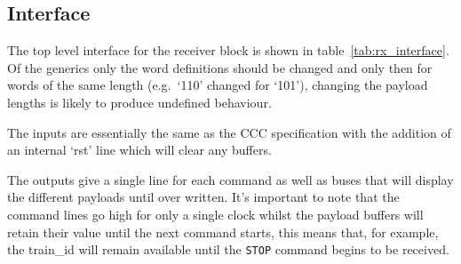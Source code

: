 \subsection{Interface} %
\label{sub:rx_interface}
The top level interface for the receiver block is shown in table~\ref{tab:rx_interface}. Of the generics only the word definitions should be changed and only then for words of the same length (e.g.\ `110' changed for `101'), changing the payload lengths is likely to produce undefined behaviour.
    
The inputs are essentially the same as the CCC specification with the addition of an internal `rst' line which will clear any buffers.
    
The outputs give a single line for each command as well as buses that will display the different payloads until over written. It's important to note that the command lines go high for only a single clock whilst the payload buffers will retain their value until the next command starts, this means that, for example, the train\_id will remain available until the \texttt{STOP} command begins to be received.
